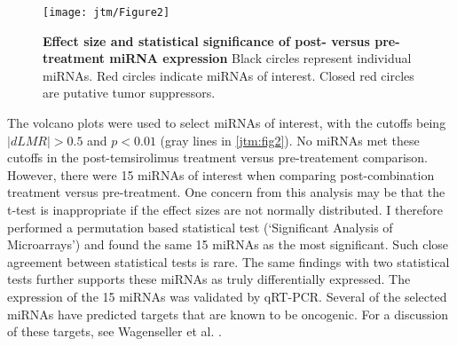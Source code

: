 \begin{figure}
  \centering
  \texttt{[image: jtm/Figure2]}
  \caption[Effect size and statistical significance of post- versus pre-treatment miRNA expression]{
       \textbf{Effect size and statistical significance of post- versus pre-treatment miRNA expression}
       Black circles represent individual miRNAs. Red circles indicate miRNAs of interest. Closed red
       circles are putative tumor suppressors.
  }
  \label{jtm:fig2}
\end{figure}

The volcano plots were used to select miRNAs of interest, with the cutoffs
being $|dLMR|>0.5$ and $p<0.01$ (gray lines in \autoref{jtm:fig2}). 
No miRNAs met these cutoffs in the
post-temsirolimus treatment versus pre-treatement comparison. However,
there were 15 miRNAs of interest when comparing post-combination treatment
versus pre-treatment. One concern from this analysis may be that the t-test
is inappropriate if the effect sizes are not normally distributed. I therefore
performed a permutation based statistical test (`Significant Analysis of Microarrays')
and found the same 15 miRNAs as the most significant. Such close agreement
between statistical tests is rare. The same findings with two statistical tests
further supports these miRNAs as truly differentially expressed.
The expression of the 15 miRNAs was validated by qRT-PCR.
Several of the selected miRNAs have predicted targets that are known
to be oncogenic. For a discussion of these targets, see Wagenseller
et al. \cite{Wagenseller:2013fj}.

